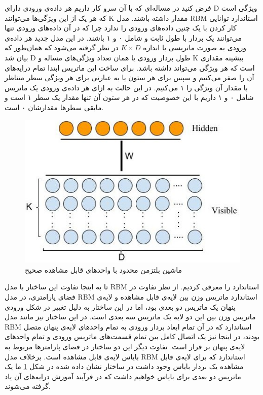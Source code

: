 فرض کنید در مساله‌ای‌ که با آن سرو کار داریم هر داده‌ی ورودی دارای
D
ویژگی‌ است که هر یک از این ویژگی‌ها می‌‌توانند 
K
مقدار داشته باشند. مدل
RBM
استاندارد توانایی کار کردن با یک چنین داده‌های ورودی را ندارد چرا که در آن داده‌های ورودی تنها می‌‌توانند یک بردار با طول ثابت و شامل ۰ و ۱ باشند. در این مدل جدید هر داده‌ی ورودی به صورت ماتریسی با اندازه
$K \times D$
در نظر گرفته می‌شود که همان‌طور که بیان شد
D
طول بردار ورودی یا همان تعداد ویژگی‌های مساله و
K
بیشینه مقداری است که هر ویژگی‌ می‌‌تواند داشته باشد. برای ساخت این ماتریس ابتدا تمام درایه‌های آن را صفر می‌‌کنیم و سپس برای هر ستون یا به عبارتی برای هر ویژگی‌ سطر متناظر با مقدار آن ویژگی‌ را ۱ می‌‌کنیم. در این حالت به ازای هر داده‌ی ورودی یک ماتریس شامل ۰ و ۱ داریم با این خصوصیت که در هر ستون آن تنها مقدار یک سطر  ۱ است و مابقی سطرها مقدارشان ۰ است.
\begin{figure}[!t]
	\centering
	\includegraphics[scale=0.5]{chap4-img/MRBM}
	\caption{ماشین بلتزمن محدود با واحدهای قابل مشاهده صحیح}
	\label{chap4-fig2}
\end{figure}

تا به اینجا تفاوت این ساختار با مدل
RBM
استاندارد را معرفی‌ کردیم. از نظر تفاوت در فضای پارامتری، در مدل
RBM
استاندارد ماتریس وزن بین لایه‌ی قابل مشاهده و لایه‌ی پنهان یک ماتریس دو بعدی بود، اما در این ساختار به دلیل تغییر در شکل ورودی ماتریس وزن بین این دو لایه یک ماتریس سه بعدی است. در این ساختار نیز مانند مدل
RBM
استاندارد که در آن تمام ابعاد بردار ورودی به تمام واحد‌های لایه‌ی پنهان متصل بودند، در اینجا نیز یک اتصال کامل بین تمام قسمت‌های ماتریس ورودی و تمام واحد‌های لایه‌ی پنهان بر قرار است. تفاوت دیگر این دو ساختار در فضای پارامتر‌ها مربوط به بایاس لایه‌ی قابل مشاهده است. برخلاف مدل
RBM
استاندارد که برای لایه‌ی قابل مشاهده یک بردار بایاس وجود داشت در ساختار نشان داده شده در شکل
\ref{chap4-fig2}
ما یک ماتریس دو بعدی برای بایاس خواهیم داشت که در فرآیند آموزش درایه‌های آن یاد گرفته می‌‌شوند.

